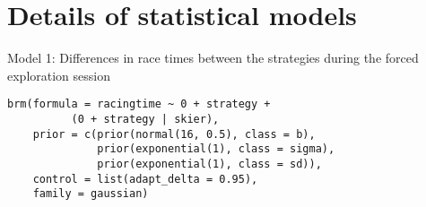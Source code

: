 \section{Details of statistical models}\label{study3:estimateddifferencebetweenstrategies}

Model 1: Differences in race times between the strategies during the forced exploration session

\begin{verbatim}
brm(formula = racingtime ~ 0 + strategy + 
          (0 + strategy | skier),
    prior = c(prior(normal(16, 0.5), class = b),
              prior(exponential(1), class = sigma),
              prior(exponential(1), class = sd)),
    control = list(adapt_delta = 0.95),
    family = gaussian)
\end{verbatim}



